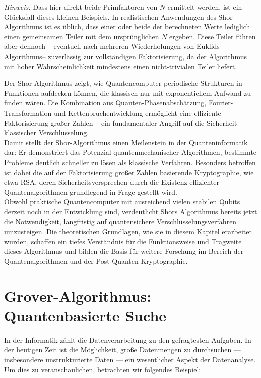{\begin{enumerate}
\textit{Hinweis:} Dass hier direkt beide Primfaktoren von \( N \) ermittelt werden, ist ein Glücksfall dieses kleinen Beispiels. In realistischen Anwendungen des Shor-Algorithmus ist es üblich, dass einer oder beide der berechneten Werte lediglich einen gemeinsamen Teiler mit dem ursprünglichen \( N \) ergeben. Diese Teiler führen aber dennoch – eventuell nach mehreren Wiederholungen von Euklids Algorithmus– zuverlässig zur vollständigen Faktorisierung, da der Algorithmus mit hoher Wahrscheinlichkeit mindestens einen nicht-trivialen Teiler liefert.

\end{enumerate}

Der Shor-Algorithmus zeigt, wie Quantencomputer periodische Strukturen in Funktionen aufdecken können, die klassisch nur mit exponentiellem Aufwand zu finden wären. Die Kombination aus Quanten-Phasenabschätzung, Fourier-Transformation und Kettenbruchentwicklung ermöglicht eine effiziente Faktorisierung großer Zahlen – ein fundamentaler Angriff auf die Sicherheit klassischer Verschlüsselung.\\

Damit stellt der Shor-Algorithmus einen Meilenstein in der Quanteninformatik dar: Er demonstriert das Potenzial quantenmechanischer Algorithmen, bestimmte Probleme deutlich schneller zu lösen als klassische Verfahren. Besonders betroffen ist dabei die auf der Faktorisierung großer Zahlen basierende Kryptographie, wie etwa RSA, deren Sicherheitsversprechen durch die Existenz effizienter Quantenalgorithmen grundlegend in Frage gestellt wird.\\

Obwohl praktische Quantencomputer mit ausreichend vielen stabilen Qubits derzeit noch in der Entwicklung sind, verdeutlicht Shors Algorithmus bereits jetzt die Notwendigkeit, langfristig auf quantensichere Verschlüsselungsverfahren umzusteigen. Die theoretischen Grundlagen, wie sie in diesem Kapitel erarbeitet wurden, schaffen ein tiefes Verständnis für die Funktionsweise und Tragweite dieses Algorithmus und bilden die Basis für weitere Forschung im Bereich der Quantenalgorithmen und der Post-Quanten-Kryptographie.

\section{Grover-Algorithmus: Quantenbasierte Suche}
\label{sec:grover-algorithm}
In der Informatik zählt die Datenverarbeitung zu den gefragtesten Aufgaben. In der heutigen Zeit ist die Möglichkeit, große Datenmengen zu durchsuchen — insbesondere unstrukturierte Daten — ein wesentlicher Aspekt der Datenanalyse. Um dies zu veranschaulichen, betrachten wir folgendes Beispiel:\\ 

}
